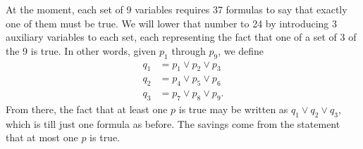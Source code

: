 \documentclass{article}
\begin{document}
At the moment, each set of 9 variables requires 37 formulas
to say that exactly one of them must be true.
We will lower that number to 24
by introducing 3 auxiliary variables to each set,
each representing the fact that
one of a set of 3 of the 9 is true.
In other words, given $p_1$ through $p_9$,
we define
\begin{align*}
  q_1 &= p_1 \lor p_2 \lor p_3 \\
  q_2 &= p_4 \lor p_5 \lor p_6 \\
  q_3 &= p_7 \lor p_8 \lor p_9.
\end{align*}
From there, the fact that at least one $p$ is true
may be written as $q_1 \lor q_2 \lor q_3$,
which is till just one formula as before.
The savings come from the statement that
at most one $p$ is true.

\end{document}
